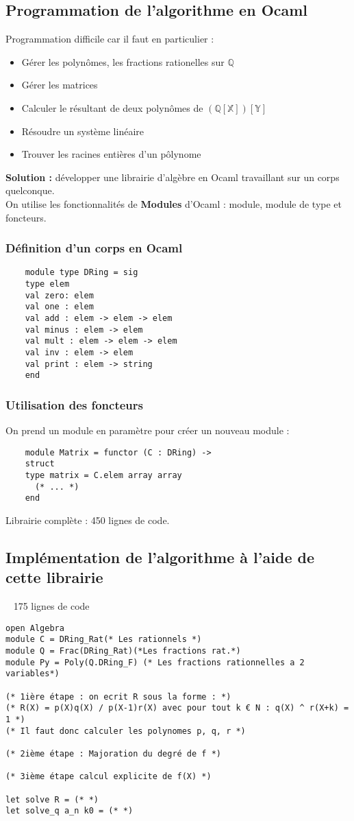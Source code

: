 \documentclass[17 pt,french]{scrartcl}
\begin{document}
\subsection*{Programmation de l'algorithme en \textbf{Ocaml}}
	
	Programmation difficile car il faut en particulier : 
	\begin{itemize}
	\item Gérer les polynômes, les fractions rationelles sur $\mathbb{Q}$
	\item Gérer les matrices
	\item Calculer le résultant de deux polynômes de $\mathbb{(Q[X])[Y]}$
	\item Résoudre un système linéaire
	\item Trouver les racines entières d'un pôlynome
	\end{itemize}
	
	\textbf{Solution : } développer une librairie d'algèbre en Ocaml travaillant sur un corps quelconque. \\
	On utilise les fonctionnalités de \textbf{Modules} d'Ocaml : module, module de type et foncteurs.
	\subsubsection*{Définition d'un corps en Ocaml}
	\begin{lstlisting}
	module type DRing = sig
   	type elem
  	val zero: elem
  	val one : elem
   	val add : elem -> elem -> elem
   	val minus : elem -> elem
    val mult : elem -> elem -> elem
    val inv : elem -> elem
    val print : elem -> string
	end
	\end{lstlisting}
	\newpage
	\subsubsection*{Utilisation des foncteurs}
	On prend un module en paramètre pour créer un nouveau module : 
	\begin{lstlisting}
	module Matrix = functor (C : DRing) ->
  	struct
  	type matrix = C.elem array array
  	  (* ... *)
  	end
  	\end{lstlisting}
  	Librairie complète : 450 lignes de code.
  	\subsection*{Implémentation de l'algorithme à l'aide de cette librairie}
  	~ 175 lignes de code
  	\begin{lstlisting}
open Algebra
module C = DRing_Rat(* Les rationnels *)
module Q = Frac(DRing_Rat)(*Les fractions rat.*)
module Py = Poly(Q.DRing_F) (* Les fractions rationnelles a 2 variables*)

(* 1ière étape : on ecrit R sous la forme : *)
(* R(X) = p(X)q(X) / p(X-1)r(X) avec pour tout k € N : q(X) ^ r(X+k) = 1 *)
(* Il faut donc calculer les polynomes p, q, r *)

(* 2ième étape : Majoration du degré de f *)

(* 3ième étape calcul explicite de f(X) *)

let solve R = (* *)
let solve_q a_n k0 = (* *)
  	\end{lstlisting}
  	\newpage
\end{document}
